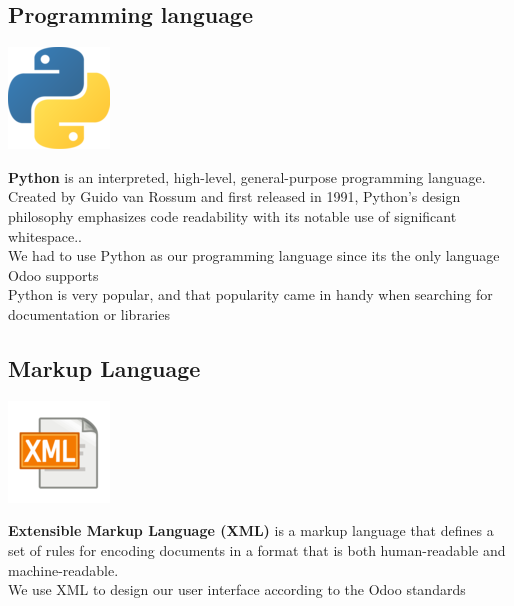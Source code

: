      \subsection*{Programming language}
         \begin{center}
         \includegraphics[scale=0.8]{img/python102.png}\\
         \end{center}
    \textbf{Python} is an interpreted, high-level, general-purpose programming language. Created by Guido van Rossum and first released in 1991, Python's design philosophy emphasizes code readability with its notable use of significant whitespace..\cite{Python}\\
    We had to use Python as our programming language since its the only language Odoo supports\\
    Python is very popular, and that popularity came in handy when searching for documentation or libraries\\
     \subsection*{Markup Language}
         \begin{center}
         \includegraphics[scale=0.9]{img/xml102.png}\\
         \end{center}
    \textbf{Extensible Markup Language (XML)} is a markup language that defines a set of rules for encoding documents in a format that is both human-readable and machine-readable.\cite{XML}\\
    We use XML to design our user interface according to the Odoo standards\\
